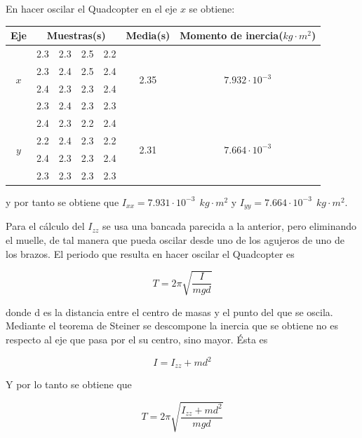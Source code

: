 \documentclass[twoside,11pt]{report}
\begin{document}
En hacer oscilar el Quadcopter en el eje $x$ se obtiene:

\begin{center}
\begin{tabular}{|c|cccc|c|c|}
\hline
\textbf{Eje} & \multicolumn{4}{c|}{\textbf{Muestras}(s)} & \textbf{Media}(s) & \textbf{Momento de inercia}($kg \cdot m^{2}$) \\
\hline
\multirow{4}{*}{$x$} & 2.3 & 2.3 & 2.5 & 2.2 & \multirow{4}{*}{2.35} & \multirow{4}{*}{$7.932\cdot 10^{-3}$} \\
& 2.3 & 2.4 & 2.5 & 2.4 & & \\
& 2.4 & 2.3 & 2.3 & 2.4 & & \\
& 2.3 & 2.4 & 2.3 & 2.3 & & \\
\hline
\multirow{4}{*}{$y$} & 2.4 & 2.3 & 2.2 & 2.4 & \multirow{4}{*}{2.31} & \multirow{4}{*}{$7.664\cdot 10^{-3}$} \\
& 2.2 & 2.4 & 2.3 & 2.2 & & \\
& 2.4 & 2.3 & 2.3 & 2.4 & & \\
& 2.3 & 2.3 & 2.3 & 2.3 & & \\
\hline
\end{tabular}
\end{center}

y por tanto se obtiene que $I_{xx}=7.931\cdot 10^{-3} \>\> kg \cdot m^{2}$ y $I_{yy}=7.664\cdot 10^{-3}\>\> kg \cdot m^{2}$.

Para el cálculo del $I_{zz}$ se usa una bancada parecida a la anterior, pero eliminando el muelle, de tal manera que pueda oscilar desde uno de los agujeros de uno de los brazos. El periodo que resulta en hacer oscilar el Quadcopter es 

\begin{equation}
T=2\pi \sqrt{\frac{I}{mgd}}
\end{equation}

donde d es la distancia entre el centro de masas y el punto del que se oscila. Mediante el teorema de Steiner se descompone la inercia que se obtiene no es respecto al eje que pasa por el su centro, sino mayor. Ésta es 

\begin{equation}
I=I_{zz}+md^{2}
\end{equation}

Y por lo tanto se obtiene que

\begin{equation}
T=2\pi \sqrt{\frac{I_{zz}+md^{2}}{mgd}}
\end{equation}
\end{document}
